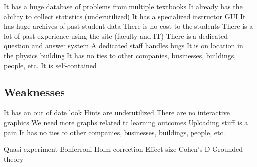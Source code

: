 It has a huge database of problems from multiple textbooks
It already has the ability to collect statistics (underutilized)
It has a specialized instructor GUI
It has huge archives of past student data
There is no cost to the students
There is a lot of past experience using the site (faculty and IT)
There is a dedicated question and answer system
A dedicated staff handles bugs
It is on location in the physics building
It has no ties to other companies, businesses, buildings, people, etc.
It is self-contained

\subsection{Weaknesses}

It has an out of date look
Hints are underutilized
There are no interactive graphics
We need more graphs related to learning outcomes
Uploading stuff is a pain
It has no ties to other companies, businesses, buildings, people, etc.

Quasi-experiment
Bonferroni-Holm correction
Effect size
Cohen’s D
Grounded theory